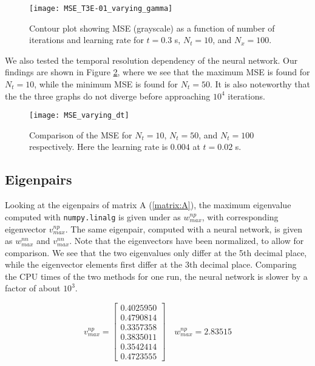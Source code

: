 \begin{figure}[htbp]
 	\centering
 	\texttt{[image: MSE\_T3E-01\_varying\_gamma]}
 	\caption{Contour plot showing MSE (grayscale) as a function of number of iterations and learning rate for $t=0.3$ s, $N_t = 10$, and $N_x = 100$.}
  \label{fig:MSE_T3E-01_varying_gamma}
\end{figure}

We also tested the temporal resolution dependency of the neural network. Our findings are shown in Figure \ref{fig:MSE_varying_dt}, where we see that the maximum MSE is found for $N_t = 10$, while the minimum MSE is found for $N_t = 50$. It is also noteworthy that the the three graphs do not diverge before approaching $10^4$ iterations.
\begin{figure}[htbp]
 	\centering
 	\texttt{[image: MSE\_varying\_dt]}
 	\caption{Comparison of the MSE for $N_t = 10$, $N_t = 50$, and $N_t = 100$ respectively. Here the learning rate is $0.004$ at $t=0.02$ s.}
  \label{fig:MSE_varying_dt}
\end{figure}


\subsection{Eigenpairs}
Looking at the eigenpairs of matrix A (\ref{matrix:A}), the maximum eigenvalue computed with  \texttt{numpy.linalg} is given under as $w_{max}^{np}$, with corresponding eigenvector $v_{max}^{np}$. The same eigenpair, computed with a neural network, is given as $w_{max}^{nn}$ and $v_{max}^{nn}$. Note that the eigenvectors have been normalized, to allow for comparison. We see that the two eigenvalues only differ at the 5th decimal place, while the eigenvector elements first differ at the 3th decimal place. Comparing the CPU times of the two methods for one run, the neural network is slower by a factor of about $10^3$.

\begin{equation*}
v_{max}^{np} = \begin{bmatrix}
	0.4025950 \\
	0.4790814 \\
	0.3357358 \\
    0.3835011 \\
    0.3542414 \\
    0.4723555
\end{bmatrix} \quad w_{max}^{np} =  2.83515
\end{equation*}

